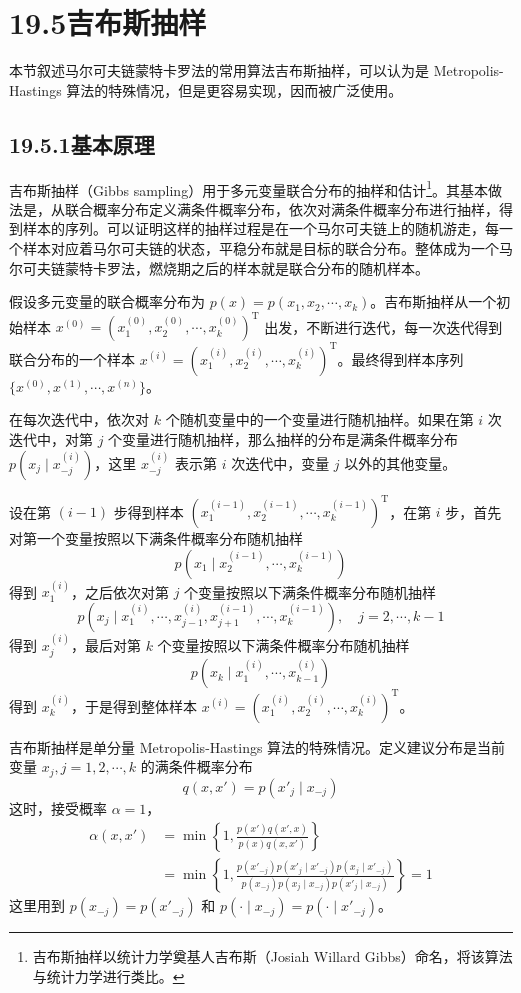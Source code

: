 \documentclass[UTF8, 12pt, fontset=fandol, oneside]{ctexart}
\begin{document}
\section*{19.5\quad 吉布斯抽样}

本节叙述马尔可夫链蒙特卡罗法的常用算法吉布斯抽样，可以认为是 Metropolis-Hastings 算法的特殊情况，但是更容易实现，因而被广泛使用。

\subsection*{19.5.1\quad 基本原理}

吉布斯抽样（Gibbs sampling）用于多元变量联合分布的抽样和估计\footnote{吉布斯抽样以统计力学奠基人吉布斯（Josiah Willard Gibbs）命名，将该算法与统计力学进行类比。}。其基本做法是，从联合概率分布定义满条件概率分布，依次对满条件概率分布进行抽样，得到样本的序列。可以证明这样的抽样过程是在一个马尔可夫链上的随机游走，每一个样本对应着马尔可夫链的状态，平稳分布就是目标的联合分布。整体成为一个马尔可夫链蒙特卡罗法，燃烧期之后的样本就是联合分布的随机样本。

假设多元变量的联合概率分布为 $p(x)=p(x_1,x_2,\cdots,x_k)$。吉布斯抽样从一个初始样本 $x^{(0)}=(x_1^{(0)},x_2^{(0)},\cdots,x_k^{(0)})^{\mathrm{T}}$ 出发，不断进行迭代，每一次迭代得到联合分布的一个样本 $x^{(i)}=(x_1^{(i)},x_2^{(i)},\cdots,x_k^{(i)})^{\mathrm{T}}$。最终得到样本序列 $\{x^{(0)},x^{(1)},\cdots,x^{(n)}\}$。

在每次迭代中，依次对 $k$ 个随机变量中的一个变量进行随机抽样。如果在第 $i$ 次迭代中，对第 $j$ 个变量进行随机抽样，那么抽样的分布是满条件概率分布 $p(x_j\mid x_{-j}^{(i)})$，这里 $x_{-j}^{(i)}$ 表示第 $i$ 次迭代中，变量 $j$ 以外的其他变量。

设在第 $(i-1)$ 步得到样本 $(x_1^{(i-1)},x_2^{(i-1)},\cdots,x_k^{(i-1)})^{\mathrm{T}}$，在第 $i$ 步，首先对第一个变量按照以下满条件概率分布随机抽样
\[
p(x_1\mid x_2^{(i-1)},\cdots,x_k^{(i-1)})
\]
得到 $x_1^{(i)}$，之后依次对第 $j$ 个变量按照以下满条件概率分布随机抽样
\[
p(x_j\mid x_1^{(i)},\cdots,x_{j-1}^{(i)},x_{j+1}^{(i-1)},\cdots,x_k^{(i-1)}),\quad j=2,\cdots,k-1
\]
得到 $x_j^{(i)}$，最后对第 $k$ 个变量按照以下满条件概率分布随机抽样
\[
p(x_k\mid x_1^{(i)},\cdots,x_{k-1}^{(i)})
\]
得到 $x_k^{(i)}$，于是得到整体样本 $x^{(i)}=(x_1^{(i)},x_2^{(i)},\cdots,x_k^{(i)})^{\mathrm{T}}$。

吉布斯抽样是单分量 Metropolis-Hastings 算法的特殊情况。定义建议分布是当前变量 $x_j,j=1,2,\cdots,k$ 的满条件概率分布
\begin{equation}
q(x,x')=p(x'_j\mid x_{-j})
\tag{19.49}
\end{equation}
这时，接受概率 $\alpha=1$，
\begin{equation}
\begin{aligned}
\alpha(x,x')&=\min\left\{1,\frac{p(x')q(x',x)}{p(x)q(x,x')}\right\}\\
&=\min\left\{1,\frac{p(x'_{-j})p(x'_j\mid x'_{-j})p(x_j\mid x'_{-j})}{p(x_{-j})p(x_j\mid x_{-j})p(x'_j\mid x_{-j})}\right\}=1
\end{aligned}
\tag{19.50}
\end{equation}
这里用到 $p(x_{-j})=p(x'_{-j})$ 和 $p(\cdot\mid x_{-j})=p(\cdot\mid x'_{-j})$。
\end{document}
